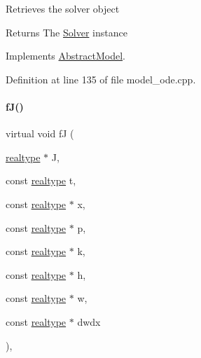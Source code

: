 Retrieves the solver object \begin{DoxyReturn}{Returns}
The \mbox{\hyperlink{classamici_1_1_solver}{Solver}} instance 
\end{DoxyReturn}


Implements \mbox{\hyperlink{classamici_1_1_abstract_model_a61d5b19b2e4d5ffcc73a014d59494344}{Abstract\+Model}}.



Definition at line 135 of file model\+\_\+ode.\+cpp.

\mbox{\label{classamici_1_1_model___o_d_e_a8b89346ce4703324beee7e7c4c8997b2}} 
\paragraph{\texorpdfstring{fJ()}{fJ()}\hspace{0.1cm}{\footnotesize\ttfamily [3/3]}}
{\footnotesize\ttfamily virtual void fJ (\begin{DoxyParamCaption}\item[{\mbox{\hyperlink{namespaceamici_a1bdce28051d6a53868f7ccbf5f2c14a3}{realtype}} $\ast$}]{J,  }\item[{const \mbox{\hyperlink{namespaceamici_a1bdce28051d6a53868f7ccbf5f2c14a3}{realtype}}}]{t,  }\item[{const \mbox{\hyperlink{namespaceamici_a1bdce28051d6a53868f7ccbf5f2c14a3}{realtype}} $\ast$}]{x,  }\item[{const \mbox{\hyperlink{namespaceamici_a1bdce28051d6a53868f7ccbf5f2c14a3}{realtype}} $\ast$}]{p,  }\item[{const \mbox{\hyperlink{namespaceamici_a1bdce28051d6a53868f7ccbf5f2c14a3}{realtype}} $\ast$}]{k,  }\item[{const \mbox{\hyperlink{namespaceamici_a1bdce28051d6a53868f7ccbf5f2c14a3}{realtype}} $\ast$}]{h,  }\item[{const \mbox{\hyperlink{namespaceamici_a1bdce28051d6a53868f7ccbf5f2c14a3}{realtype}} $\ast$}]{w,  }\item[{const \mbox{\hyperlink{namespaceamici_a1bdce28051d6a53868f7ccbf5f2c14a3}{realtype}} $\ast$}]{dwdx }\end{DoxyParamCaption})\hspace{0.3cm}{\ttfamily [protected]}, {}}


